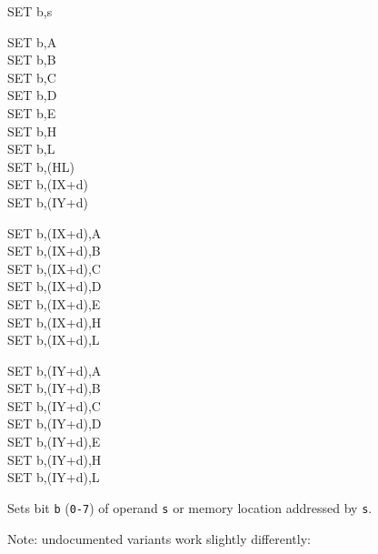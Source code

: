 \begin{basedescript}{
	\desclabelstyle{\multilinelabel}
	\desclabelwidth{3cm}}
\begin{DetailItem}{SET b,s}
		\begin{DetailVariants}
			SET b,A\\
			SET b,B\\
			SET b,C\\
			SET b,D\\
			SET b,E\\
			SET b,H\\
			SET b,L\\
			SET b,(HL)\\
			SET b,(IX+d)\\
			SET b,(IY+d)

			\columnbreak
			SET b,(IX+d),A\UNDOC\\
			SET b,(IX+d),B\UNDOC\\
			SET b,(IX+d),C\UNDOC\\
			SET b,(IX+d),D\UNDOC\\
			SET b,(IX+d),E\UNDOC\\
			SET b,(IX+d),H\UNDOC\\
			SET b,(IX+d),L\UNDOC

			\columnbreak
			SET b,(IY+d),A\UNDOC\\
			SET b,(IY+d),B\UNDOC\\
			SET b,(IY+d),C\UNDOC\\
			SET b,(IY+d),D\UNDOC\\
			SET b,(IY+d),E\UNDOC\\
			SET b,(IY+d),H\UNDOC\\
			SET b,(IY+d),L\UNDOC
		\end{DetailVariants}

		Sets bit {\tt b} ({\tt 0-7}) of operand {\tt s} or memory location addressed by {\tt s}.

		Note: undocumented variants work slightly differently:

		\begin{multicols}{2}

		\end{multicols}

		\begin{DetailEffects}
			\FlagsSETr
		\end{DetailEffects}			

		\begin{DetailTiming}
		\end{DetailTiming}


\end{DetailItem}
\end{basedescript}
